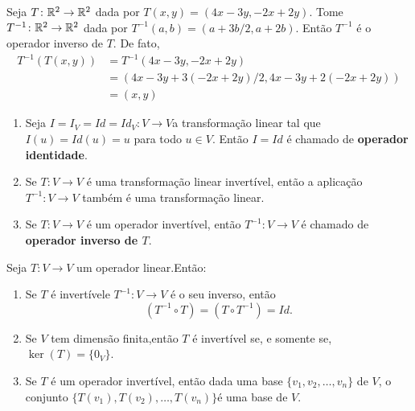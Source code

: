 \begin{exemplo}
    Seja $T \colon \mathbb{R}^2 \to \mathbb{R}^2$ dada por $T(x, y) = (4x - 3y, -2x + 2y)$. Tome $T^{-1} \colon \mathbb{R}^2 \to \mathbb{R}^2$ dada por $T^{-1}(a, b) = (a + 3b/2, a + 2b)$. Então $T^{-1}$ é o operador inverso de $T$. De fato,
    \begin{align*}
        T^{-1}(T(x, y)) &= T^{-1}(4x - 3y, -2x + 2y) \\ &= (4x - 3y + 3(-2x + 2y)/2, 4x - 3y + 2(-2x + 2y)) \\ &= (x, y)
    \end{align*}
\end{exemplo}

\begin{observacoes}
    \begin{enumerate}[label={\roman*})]
        \item Seja $I = I_V = Id = Id_V \colon V \to V$a transformação linear tal que $I(u) = Id(u) = u$ para todo $u \in V$. Então $I = Id$ é chamado de \textbf{operador identidade}.

        \item Se $T \colon V \to V$ é uma transformação linear invertível, então a aplicação $T^{-1} \colon V \to V$ também é uma transformação linear.

        \item Se $T \colon V \to V$ é um operador invertível, então $T^{-1} \colon V \to V$ é chamado de \textbf{operador inverso de $T$}.
    \end{enumerate}
\end{observacoes}

\begin{proposicao}
    Seja $T \colon V \to V$ um operador linear.Então:
    \begin{enumerate}[label={\roman*})]
        \item Se $T$ é invertívele $T^{-1} \colon V \to V$ é o seu inverso, então
        \[
            (T^{-1} \circ T) =(T \circ T^{-1}) =Id.
        \]

        \item Se $V$ tem dimensão finita,então $T$ é invertível se, e somente se, $\ker(T) = \{0_V\}$.

        \item Se $T$ é um operador invertível, então dada uma base $\{v_1, v_2, \dots, v_n\}$ de $V$, o conjunto $\{T(v_1),T(v_2),\dots, T(v_n)\}$é uma base de $V$.
    \end{enumerate}
\end{proposicao}

